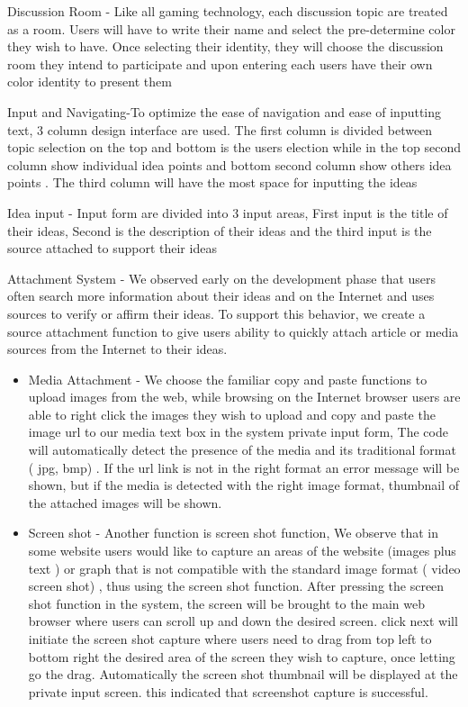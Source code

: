 \documentclass{sigchi}
\begin{document}
\item Discussion Room - Like all gaming technology, each discussion  topic are treated as a room.  Users will have to write their name and select the pre-determine color they wish to have. Once selecting their identity, they will choose the discussion room they intend to participate and upon entering each users have their own color identity to present them 
\item  Input and Navigating-To optimize the ease of navigation and ease of inputting text, 3 column design interface are used. The first column is divided between topic selection on the top and bottom is the users election while in the top second column show individual idea points and bottom second column show others idea points . The third column will have the most space for inputting the ideas
\item Idea input - Input form are divided into 3 input  areas, First input is the title of their ideas, Second is the description of their ideas and  the third input is the source  attached to support their ideas
\item Attachment System - We observed early on the development phase  that users often search more information about their ideas and on the Internet and uses sources to verify or affirm  their ideas. To support this behavior, we create a source attachment function to give users ability to quickly attach article or media sources from the Internet to their ideas. 
\begin{itemize}
  \item  Media Attachment - We choose the familiar copy and paste functions to upload images from the web, while browsing on the Internet browser users are able to right click the images they wish to upload and copy and paste the image url to our media text box in the system private input form, The code will automatically detect the presence of the media and its traditional format ( jpg, bmp) . If the url link is not in the right format an error message will be shown, but if the media is detected with the right image format,  thumbnail of the attached images will be shown.
  \item Screen shot - Another function is screen shot function, We observe that in some website users would like to capture an areas of the website (images plus text ) or graph that is not compatible with the standard image format ( video screen shot) , thus using the screen shot function. After pressing the screen shot function in the system, the screen will be brought to the main web browser where users can scroll up and down the desired screen. click next will initiate the screen shot capture where users need to drag from top left to bottom right the desired area of the screen they wish to capture, once letting go the drag. Automatically the screen shot thumbnail will be displayed at the private input screen. this indicated that screenshot capture is successful. 
\end{itemize}
\end{document}
